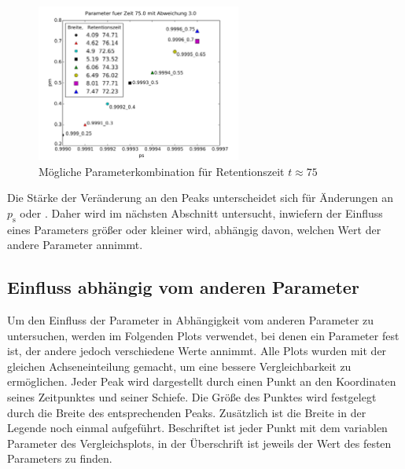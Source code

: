 \begin{figure}[]
\centering
\includegraphics[width=0.6\textwidth]{bilder/paramsfuert75}
\caption{Mögliche Parameterkombination für Retentionszeit $t \approx 75$}
\label{params_at_time}
\end{figure}

Die Stärke der Veränderung an den Peaks unterscheidet sich für Änderungen an $p_{\text{s}}$ oder \pm. Daher wird im nächsten Abschnitt untersucht, inwiefern der Einfluss eines Parameters größer oder kleiner wird, abhängig davon, welchen Wert der andere Parameter annimmt.

\subsection{Einfluss abhängig vom anderen Parameter}

Um den Einfluss der Parameter in Abhängigkeit vom anderen Parameter zu untersuchen, werden im Folgenden Plots verwendet, bei denen ein Parameter fest ist, der andere jedoch verschiedene Werte annimmt. Alle Plots wurden mit der gleichen Achseneinteilung gemacht, um eine bessere Vergleichbarkeit zu ermöglichen. Jeder Peak wird dargestellt durch einen Punkt an den Koordinaten seines Zeitpunktes und seiner Schiefe. Die Größe des Punktes wird festgelegt durch die Breite des entsprechenden Peaks. Zusätzlich ist die Breite in der Legende noch einmal aufgeführt. Beschriftet ist jeder Punkt mit dem variablen Parameter des Vergleichsplots, in der Überschrift ist jeweils der Wert des festen Parameters zu finden.


